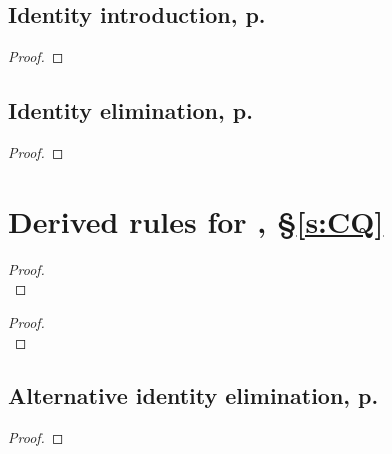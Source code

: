 \begin{multicols}{2}
\subsection*{Identity introduction, p.\ \pageref{idint}}

\begin{proof}
	 \idi{}
\end{proof}


\subsection*{Identity elimination, p.\ \pageref{idelim}}

\begin{proof}
	 
\end{proof}
\end{multicols}

\section*{Derived rules for \FOL, §\ref{s:CQ}}
\begin{multicols}{2}
\begin{proof}

\\	
\end{proof}
\begin{proof}

\\	
\end{proof}

\subsection*{Alternative identity elimination, p.\ \pageref{id.es}}
\begin{proof}
	 
	\end{proof}
\end{multicols}

\renewcommand{\indexname}{Index of defined terms}\printindex %
